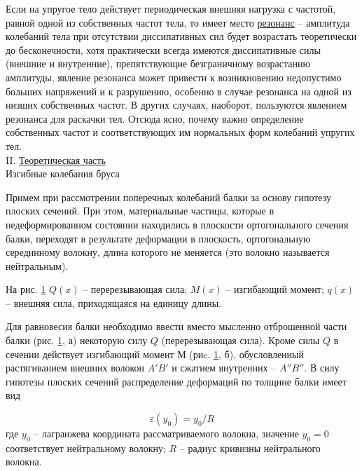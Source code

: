 \documentclass[specialist, subf, href, colorlinks=true, 14pt, final]{disser}
\theoremstyle{definition}
\begin{document}
Если на упругое тело действует периодическая внешняя нагрузка с частотой, равной одной из собственных частот тела, то имеет место \underline{резонанс} -- амплитуда колебаний тела при отсутствии диссипативных сил будет возрастать теоретически до бесконечности, хотя практически всегда имеются диссипативные силы (внешние и
внутренние), препятствующие безграничному возрастанию амплитуды,
явление резонанса может привести к возникновению недопустимо
больших напряжений и к разрушению, особенно в случае резонанса на одной из низших собственных частот. В других случаях, наоборот, пользуются явлением резонанса для раскачки тел. Отсюда ясно, почему важно определение собственных частот и соответствующих им нормальных форм колебаний упругих тел.\\
\noindent II. \underline{Теоретическая часть}\\
Изгибные колебания бруса

Примем при рассмотрении поперечных колебаний балки за основу гипотезу плоских сечений. При этом, материальные частицы, которые в недеформированном состоянии находились в плоскости ортогонального сечения балки, переходят в результате деформации в плоскость, ортогональную серединному волокну, длина которого не меняется (это волокно называется нейтральным).
\begin{figure}[!htp]
  \caption{}
  \label{1-3-1}
\end{figure}
На рис. \ref{1-3-1} $Q(x)$ -- перерезывающая сила; $M(x)$ -- изгибающий момент; $q(x)$ -- внешняя сила, приходящаяся на единицу длины.

Для равновесия балки необходимо ввести вместо мысленно отброшенной части балки (рис. \ref{1-3-1}, а) некоторую силу $Q$ (перерезывающая сила). Кроме силы $Q$ в сечении действует изгибающий момент $М$ (риc. \ref{1-3-1}, б), обусловленный растягиванием внешних волокон $A'B'$ и сжатием внутренних -- $A''B''$. В силу гипотезы плоских сечений распределение деформаций по толщине балки имеет вид
\addtocounter{equation}{1}
\begin{equation}\label{eq:131}
  \varepsilon(y_{0}) = y_{0}/R
  \tag{1}
\end{equation}
где $y_0$ -- лагранжева координата рассматриваемого волокна, значение $y_{0}=0$ соответствует нейтральному волокну; $R$ -- радиус кривизны нейтрального волокна.
\end{document}
